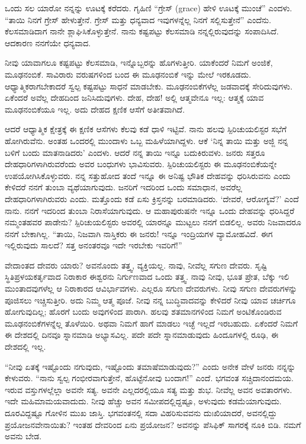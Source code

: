 ಒಂದು ಸಲ ಯಾರೋ ನನ್ನನ್ನು ಊಟಕ್ಕೆ ಕರೆದರು. ಗೃಹಿಣಿ “ಗ್ರೇಸ್ (grace) ಹೇಳಿ ಊಟಕ್ಕೆ ಮುಂಚೆ” ಎಂದಳು. “ತಾಯಿ ನಿನಗೆ ಗ್ರೇಸ್ ಹೇಳುತ್ತೇನೆ. ಗ್ರೇಸ್ ಮತ್ತು ಧನ್ಯವಾದ ಇವುಗಳನ್ನೆಲ್ಲ ನಿನಗೆ ಸಲ್ಲಿಸುತ್ತೇನೆ'' ಎಂದೆನು. ಕೆಲಸಮಾಡಿದಾಗ ನಾನೇ ಶ್ಲಾಘಿಸಿಕೊಳ್ಳುತ್ತೇನೆ. ನಾನು ಕಷ್ಟಪಟ್ಟು ಕೆಲಸಮಾಡಿ ನನ್ನಲ್ಲಿರುವುದನ್ನು ಸಂಪಾದಿಸಿದೆ. ಆದಕಾರಣ ನನಗೆಯೇ ಧನ್ಯವಾದ.

ನೀವು ಯಾವಾಗಲೂ ಕಷ್ಟಪಟ್ಟು ಕೆಲಸಮಾಡಿ, ಇನ್ನೊಬ್ಬರನ್ನು ಹೊಗಳುತ್ತೀರಿ. ಯಾಕೆಂದರೆ ನಿಮಗೆ ಅಂಜಿಕೆ, ಮೂಢನಂಬಿಕೆ. ಸಾವಿರಾರು ವರುಷಗಳಿಂದ ಬಂದ ಈ ಮೂಢನಂಬಿಕೆ ಇನ್ನು ಮೇಲೆ ಇರಕೂಡದು. ಆಧ್ಯಾತ್ಮಿಕರಾಗಬೇಕಾದರೆ ಸ್ವಲ್ಪ ಕಷ್ಟಪಟ್ಟು ಸಾಧನೆ ಮಾಡಬೇಕು. ಮೂಢನಂಬಿಕೆಗಳೆಲ್ಲ ಜಡವಾದಕ್ಕೆ ಸೇರಿದುವುಗಳು. ಏಕೆಂದರೆ ಅವೆಲ್ಲ ದೇಹದಿಂದ ಜನಿಸಿದುವುಗಳು. ದೇಹ, ದೇಹ! ಅಲ್ಲಿ ಆತ್ಮವೇನೂ ಇಲ್ಲ: ಆತ್ಮಕ್ಕೆ ಯಾವ ಮೂಢನಂಬಿಕೆಯೂ ಇಲ್ಲ. ಅದು ದೇಹದ ಕ್ಷಣಿಕ ಆಸೆಗೆ ಅತೀತವಾಗಿದೆ.

ಆದರೆ ಆಧ್ಯಾತ್ಮಿಕ ಕ್ಷೇತ್ರಕ್ಕೆ ಈ ಕ್ಷಣಿಕ ಆಸೆಗಳು ಕೆಲವು ಕಡೆ ಧಾಳಿ ಇಟ್ಟಿವೆ. ನಾನು ಹಲವು ಸ್ಪಿರಿಚುಯಲಿಸ್ಟರ ಸಭೆಗೆ ಹೋಗಿರುವೆನು. ಅಂತಹ ಒಂದರಲ್ಲಿ ಮುಂದಾಳು ಒಬ್ಬ ಮಹಿಳೆಯಾಗಿದ್ದಳು. ಆಕೆ `ನಿನ್ನ ತಾಯಿ ಮತ್ತು ಅಜ್ಜಿ ನನ್ನ ಬಳಿಗೆ ಬಂದು ಮಾತನಾಡಿದರು' ಎಂದಳು. ಆದರೆ ನನ್ನ ತಾಯಿ ಇನ್ನೂ ಬದುಕಿರುವಳು. ಜನರು ಸತ್ತರೂ ದೇಹಧಾರಿಗಳಾಗಿರುವರೆಂದು ಅವರ ಬಂಧುಗಳು ಭಾವಿಸುವರು. ಸ್ಪಿರಿಚುಯಲಿಸ್ಟರು ಈ ಮೂಢನಂಬಿಕೆಯನ್ನೇ ಉಪಯೋಗಿಸಿಕೊಳ್ಳುವರು. ನನ್ನ ಸತ್ತುಹೋದ ತಂದೆ ಇನ್ನೂ ಈ ಅನಿಷ್ಟ ಭೌತಿಕ ದೇಹವನ್ನು ಧರಿಸಿರುವನು ಎಂದು ಕೇಳಿದರೆ ನನಗೆ ತುಂಬಾ ವ್ಯಥೆಯಾಗುವುದು. ಜನರಿಗೆ ಇದರಿಂದ ಒಂದು ಸಮಾಧಾನ, ಅವರೆಲ್ಲ ದೇಹಧಾರಿಗಳಾಗಿರುವರು ಎಂದು. ಮತ್ತೊಂದು ಕಡೆ ಏಸು ಕ್ರಿಸ್ತನನ್ನು ಬರಮಾಡಿದರು. `ದೇವರೆ, ಆರೋಗ್ಯವೆ?' ಎಂದೆ ನಾನು. ನನಗೆ ಇದರಿಂದ ತುಂಬಾ ನಿರಾಸೆಯಾಗುವುದು. ಆ ಮಹಾಪುರುಷನೇ ಇನ್ನೂ ಒಂದು ದೇಹವನ್ನು ಧರಿಸಿದ್ದರೆ ನಮ್ಮಂತಹವರ ಪಾಡೇನು? ಸ್ಪಿರಿಚುಯಲಿಸ್ಟರು ಅವರಲ್ಲಿ ಯಾರನ್ನೂ ಮುಟ್ಟಲು ನನಗೆ ಬಿಡಲಿಲ್ಲ. ಅವರು ನಿಜವಾದರೂ ನನಗೆ ಬೇಕಾಗಿಲ್ಲ. “ತಾಯಿ, ನಿಜವಾಗಿ ನಾಸ್ತಿಕರು ಈ ಜನರು! ಇನ್ನೂ ಇಂದ್ರಿಯಗಳ ವ್ಯಾಮೋಹವಿದೆ. ಈಗ ಇಲ್ಲಿರುವುದು ಸಾಲದೆ? ಸತ್ತ ಅನಂತರವೂ ಇದೇ ಇರಬೇಕು ಇವರಿಗೆ!”

ವೇದಾಂತದ ದೇವರು ಯಾರು? ಅವನೊಂದು ತತ್ತ್ವ, ವ್ಯಕ್ತಿಯಲ್ಲ. ನಾವು, ನೀವೆಲ್ಲ ಸಗುಣ ದೇವರು. ಸೃಷ್ಟಿ ಸ್ಥಿತಿಪ್ರಳಯಕರ್ತೃವಾದ ನಿರಾಕಾರ ಈಶ್ವರನು ನಿರ್ಗುಣವಾದ ಒಂದು ತತ್ತ್ವ. ನಾವು ನೀವು, ಭೂತ ಪ್ರೇತ, ಬೆಕ್ಕು ಇಲಿ ಮುಂತಾದವುಗಳೆಲ್ಲ ಆ ನಿರಾಕಾರದ ಆವಿರ್ಭಾವಗಳು. ಎಲ್ಲರೂ ಸಗುಣ ದೇವರುಗಳು. ನೀವು ಸಗುಣ ದೇವರುಗಳನ್ನು ಪೂಜಿಸಲು ಇಚ್ಚಿಸುತ್ತೀರಿ. ಅದು ನಿಮ್ಮ ಆತ್ಮ ಪೂಜೆ. ನೀವು ನನ್ನ ಬುದ್ಧಿವಾದವನ್ನು ಕೇಳಿದರೆ ನೀವು ಯಾವ ಚರ್ಚಿಗೂ ಹೋಗುವುದಿಲ್ಲ; ಹೊರಗೆ ಬಂದು ಅವುಗಳಿಂದ ಪಾರಾಗಿ. ಹಲವು ಶತಮಾನಗಳಿಂದ ನಿಮಗೆ ಅಂಟಿಕೊಂಡಿರುವ ಮೂಢನಂಬಿಕೆಗಳನ್ನೆಲ್ಲ ತೊಳೆಯಿರಿ. ಅಥವಾ ನಿಮಗೆ ಹಾಗೆ ಮಾಡಲು ಇಚ್ಛೆ ಇಲ್ಲದೆ ಇರಬಹುದು. ಏಕೆಂದರೆ ನಿಮಗೆ ಈ ದೇಶದಲ್ಲಿ ದಿನವೂ ಸ್ನಾನಮಾಡಿ ಅಭ್ಯಾಸವಿಲ್ಲ. ಪದೇ ಪದೇ ಸ್ನಾನಮಾಡುವುದು ಹಿಂದೂಗಳಲ್ಲಿ ರೂಢಿ, ಈ ದೇಶದಲ್ಲಿ ಇಲ್ಲ.

“ನೀವು ಏತಕ್ಕೆ ಇಷ್ಟೊಂದು ನಗುವುದು, ಇಷ್ಟೊಂದು ತಮಾಷೆಮಾಡುವುದು?'' ಎಂದು ಅನೇಕ ವೇಳೆ ಜನರು ನನ್ನನ್ನು ಕೇಳುವರು. “ನಾನು ಸ್ವಲ್ಪ ಗಂಭೀರವಾಗುತ್ತೇನೆ, ಹೊಟ್ಟೆನೋವು ಬಂದಾಗ!” ಎಂದೆ. ಭಗವಂತ ಸಚ್ಚಿದಾನಂದಮಯ. ಇರುವ ವಸ್ತುಗಳಲ್ಲೆಲ್ಲಾ ಅವನೇ ಸತ್ಯ. ಅವನೇ ಎಲ್ಲದರಲ್ಲಿಯೂ ಸತ್ಯ ಮತ್ತು ಶುಭ. ನೀವೆಲ್ಲ ಅವನ ಅವತಾರಗಳು. ಇದೇ ಮಹಿಮಾಮಯವಾದುದು. ನೀವು ಹೆಚ್ಚು ಅವನ ಸಮೀಪದಲ್ಲಿದ್ದಷ್ಟೂ, ಅಳುವುದು ಕಡಮೆಯಾಗುವುದು. ದೂರವಿದ್ದಷ್ಟೂ ಗೋಳಿನ ಮುಖ ಜಾಸ್ತಿ. ಭಗವಂತನಲ್ಲಿ ಸದಾ ವಿಹರಿಸುವವನು ದುಃಖಿಯಾದರೆ, ಅವನಲ್ಲಿದ್ದು ಪ್ರಯೋಜನವೇನಾಯಿತು? ಇಂತಹ ದೇವರಿಂದ ಏನು ಪ್ರಯೋಜನ? ಅವನನ್ನು ಪೆಸಿಫಿಕ್ ಸಾಗರಕ್ಕೆ ನೂಕಿ ಬಿಡಿ. ನಮಗೆ ಅವನು ಬೇಡ.

